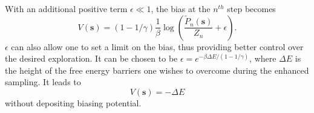 With an additional positive term $\epsilon \ll 1$, the bias at the $n^{th}$ step becomes
\begin{equation}
	V(\mathbf{s})=(1-1/\gamma)\frac{1}{\beta} \log{\left(\frac{\tilde{P}_n(\mathbf{s})}{Z_n}+\epsilon\right)}.
\end{equation}
$\epsilon$ can also allow one to set a limit on the bias, thus providing better control over the desired exploration. It can be chosen to be $\epsilon=e^{-\beta \Delta E/(1-1/\gamma)}$, where $\Delta E$ is the height of the free energy barriers one wishes to overcome during the enhanced sampling. It leads to
\begin{equation}
	V(\mathbf{s})= -\Delta E
\end{equation}
without depositing biasing potential.
